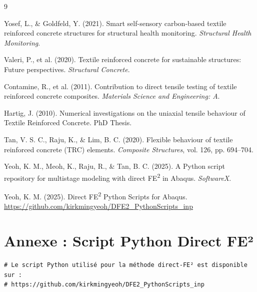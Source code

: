 \documentclass{rapportECL}
\begin{document}

\begin{thebibliography}{9}

Yosef, L., \& Goldfeld, Y. (2021).
Smart self-sensory carbon-based textile reinforced concrete structures for structural health monitoring.
\textit{Structural Health Monitoring}.

Valeri, P., et al. (2020).
Textile reinforced concrete for sustainable structures: Future perspectives.
\textit{Structural Concrete}.

Contamine, R., et al. (2011).
Contribution to direct tensile testing of textile reinforced concrete composites.
\textit{Materials Science and Engineering: A}.

Hartig, J. (2010).
Numerical investigations on the uniaxial tensile behaviour of Textile Reinforced Concrete.
PhD Thesis.

Tan, V. S. C., Raju, K., \& Lim, B. C. (2020).
Flexible behaviour of textile reinforced concrete (TRC) elements.
\textit{Composite Structures}, vol. 126, pp. 694--704.

Yeoh, K. M., Meoh, K., Raju, R., \& Tan, B. C. (2025).
A Python script repository for multistage modeling with direct FE\textsuperscript{2} in Abaqus.
\textit{SoftwareX}.

Yeoh, K. M. (2025).
Direct FE\textsuperscript{2} Python Scripts for Abaqus.
\url{https://github.com/kirkmingyeoh/DFE2_PythonScripts_inp}

\end{thebibliography}

\newpage

\section*{Annexe : Script Python Direct FE²}
\begin{framed}
\begin{verbatim}
# Le script Python utilisé pour la méthode direct-FE² est disponible sur :
# https://github.com/kirkmingyeoh/DFE2_PythonScripts_inp
\end{verbatim}
\end{framed}
\end{document}
